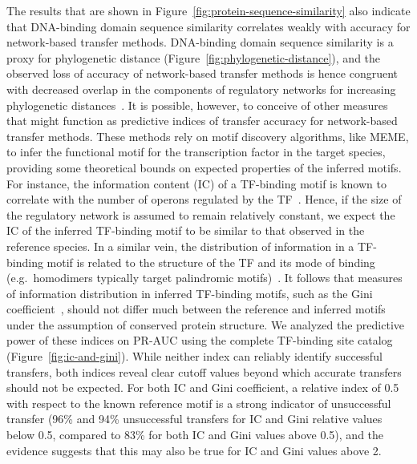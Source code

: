 The results that are shown in Figure~\ref{fig:protein-sequence-similarity} also
indicate that DNA-binding domain sequence similarity correlates weakly with
accuracy for network-based transfer methods. DNA-binding domain sequence
similarity is a proxy for phylogenetic distance
(Figure~\ref{fig:phylogenetic-distance}), and the observed loss of accuracy of
network-based transfer methods is hence congruent with decreased overlap in the
components of regulatory networks for increasing phylogenetic
distances~\citep{venancio2009reconstructing, baumbach2010power,
  price2007orthologous}. It is possible, however, to conceive of other measures
that might function as predictive indices of transfer accuracy for
network-based transfer methods. These methods rely on motif discovery
algorithms, like MEME, to infer the functional motif for the transcription
factor in the target species, providing some theoretical bounds on expected
properties of the inferred motifs. For instance, the information content (IC)
of a TF-binding motif is known to correlate with the number of operons
regulated by the TF~\citep{schneider1986information}. Hence, if the size of the
regulatory network is assumed to remain relatively constant, we expect the IC
of the inferred TF-binding motif to be similar to that observed in the
reference species. In a similar vein, the distribution of information in a
TF-binding motif is related to the structure of the TF and its mode of binding
(e.g.\ homodimers typically target palindromic
motifs)~\citep{ravcheev2014comparative, gelfand1999recognition,
  schneider1996reading}. It follows that measures of information distribution
in inferred TF-binding motifs, such as the Gini
coefficient~\citep{dorfman1979formula}, should not differ much between the
reference and inferred motifs under the assumption of conserved protein
structure. We analyzed the predictive power of these indices on PR-AUC using
the complete TF-binding site catalog (Figure~\ref{fig:ic-and-gini}). While
neither index can reliably identify successful transfers, both indices reveal
clear cutoff values beyond which accurate transfers should not be expected. For
both IC and Gini coefficient, a relative index of 0.5 with respect to the known
reference motif is a strong indicator of unsuccessful transfer (96\% and 94\%
unsuccessful transfers for IC and Gini relative values below 0.5, compared to
83\% for both IC and Gini values above 0.5), and the evidence suggests that
this may also be true for IC and Gini values above 2.

